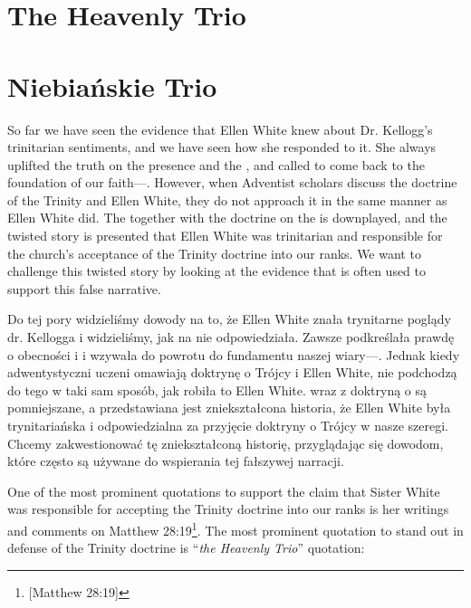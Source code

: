 \chapter{The Heavenly Trio}


\chapter{Niebiańskie Trio}


So far we have seen the evidence that Ellen White knew about Dr. Kellogg's trinitarian sentiments, and we have seen how she responded to it. She always uplifted the truth on the presence and the , and called to come back to the foundation of our faith—. However, when Adventist scholars discuss the doctrine of the Trinity and Ellen White, they do not approach it in the same manner as Ellen White did. The  together with the doctrine on the  is downplayed, and the twisted story is presented that Ellen White was trinitarian and responsible for the church's acceptance of the Trinity doctrine into our ranks. We want to challenge this twisted story by looking at the evidence that is often used to support this false narrative.


Do tej pory widzieliśmy dowody na to, że Ellen White znała trynitarne poglądy dr. Kellogga i widzieliśmy, jak na nie odpowiedziała. Zawsze podkreślała prawdę o obecności i  i wzywała do powrotu do fundamentu naszej wiary—. Jednak kiedy adwentystyczni uczeni omawiają doktrynę o Trójcy i Ellen White, nie podchodzą do tego w taki sam sposób, jak robiła to Ellen White.  wraz z doktryną o  są pomniejszane, a przedstawiana jest zniekształcona historia, że Ellen White była trynitariańska i odpowiedzialna za przyjęcie doktryny o Trójcy w nasze szeregi. Chcemy zakwestionować tę zniekształconą historię, przyglądając się dowodom, które często są używane do wspierania tej fałszywej narracji.


One of the most prominent quotations to support the claim that Sister White was responsible for accepting the Trinity doctrine into our ranks is her writings and comments on Matthew 28:19\footnote{[Matthew 28:19]}. The most prominent quotation to stand out in defense of the Trinity doctrine is “\textit{the Heavenly Trio}” quotation:


